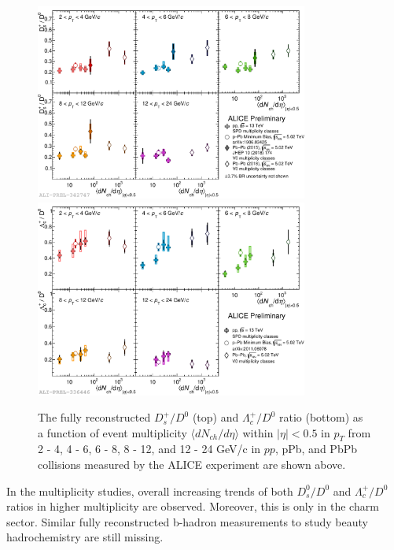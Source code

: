 \begin{figure}[hbtp]
\begin{center}
\includegraphics[width=0.80\textwidth]{Figures/Chapter2/ALICEDsD0Multi.pdf}
\includegraphics[width=0.80\textwidth]{Figures/Chapter2/ALICELambdaD0Multi.pdf}
\caption{The fully reconstructed $D^+_s/D^0$ (top) and $\Lambda_c^+/D^0$ ratio (bottom) as a function of event multiplicity $\langle dN_{ch}/d\eta \rangle$ within $|\eta| < 0.5$ in $p_T$ from 2 - 4, 4 - 6, 6 - 8, 8 - 12, and 12 - 24 GeV/c in $pp$, pPb, and PbPb collisions measured by the ALICE experiment are shown above.}
\label{ALICEMulti}
\end{center}
\end{figure}   



In the multiplicity studies, overall increasing trends of both $D^0_s/D^0$ and $\Lambda_c^+/D^0$ ratios in higher multiplicity are observed. Moreover, this is only in the charm sector. Similar fully reconstructed b-hadron measurements to study beauty hadrochemistry are still missing. 


